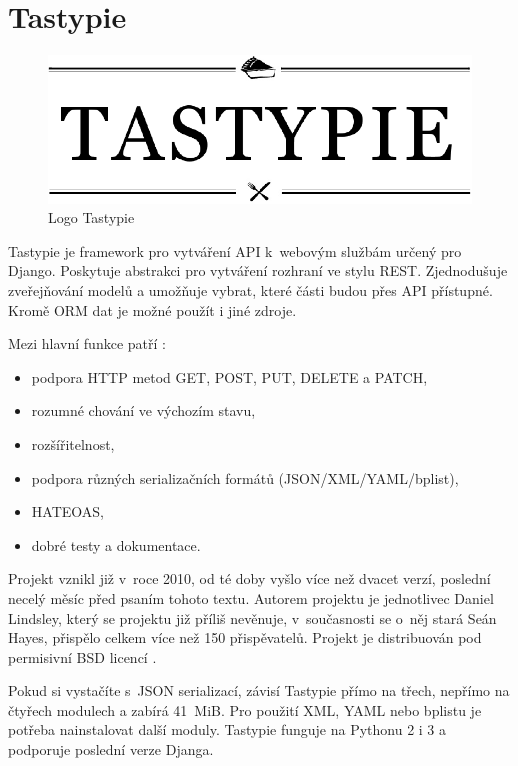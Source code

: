 \section{Tastypie}\label{tastypie}

\begin{figure}
\centering
\includegraphics{images/tastypie}
\caption{Logo Tastypie \autocite{tastypie}\label{pic:tastypie}}
\end{figure}

Tastypie je framework pro vytváření API k~webovým službám určený pro Django. Poskytuje abstrakci pro vytváření rozhraní ve stylu REST. Zjednodušuje zveřejňování modelů a umožňuje vybrat, které části budou přes API přístupné. Kromě ORM dat je možné použít i jiné zdroje. \autocite{tastypie}

Mezi hlavní funkce patří \autocite{tastypie}:

\begin{itemize}
\tightlist
\item
  podpora HTTP metod GET, POST, PUT, DELETE a PATCH,
\item
  rozumné chování ve výchozím stavu,
\item
  rozšířitelnost,
\item
  podpora různých serializačních formátů (JSON/XML/YAML/bplist),
\item
  HATEOAS,
\item
  dobré testy a dokumentace.
\end{itemize}

Projekt vznikl již v~roce 2010, od té doby vyšlo více než dvacet verzí, poslední necelý měsíc před psaním tohoto textu. Autorem projektu je jednotlivec Daniel Lindsley, který se projektu již příliš nevěnuje, v~současnosti se o~něj stará Seán Hayes, přispělo celkem více než 150 přispěvatelů. Projekt je distribuován pod permisivní BSD licencí \autocite{BSD3}.

Pokud si vystačíte s~JSON serializací, závisí Tastypie přímo na třech, nepřímo na čtyřech modulech a zabírá 41~MiB. Pro použití XML, YAML nebo bplistu je potřeba nainstalovat další moduly. Tastypie funguje na Pythonu 2 i 3 a podporuje poslední verze Djanga.

